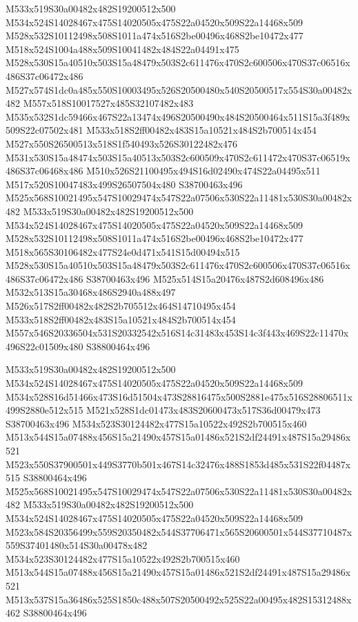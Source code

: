 \documentclass{article}
\begin{document}
\begin{multicols}{2}
M533x519S30a00482x482S19200512x500 M534x524S14028467x475S14020505x475S22a04520x509S22a14468x509 M528x532S10112498x508S1011a474x516S2be00496x468S2be10472x477 M518x524S1004a488x509S10041482x484S22a04491x475 M528x530S15a40510x503S15a48479x503S2c611476x470S2c600506x470S37c06516x486S37c06472x486 M527x574S1dc0a485x550S10003495x526S20500480x540S20500517x554S30a00482x482 M557x518S10017527x485S32107482x483 M535x532S1dc59466x467S22a13474x496S20500490x484S20500464x511S15a3f489x509S22c07502x481 M533x518S2ff00482x483S15a10521x484S2b700514x454 M527x550S26500513x518S1f540493x526S30122482x476 M531x530S15a48474x503S15a40513x503S2c600509x470S2c611472x470S37c06519x486S37c06468x486 M510x526S21100495x494S16d02490x474S22a04495x511 M517x520S10047483x499S26507504x480 S38700463x496 M525x568S10021495x547S10029474x547S22a07506x530S22a11481x530S30a00482x482 M533x519S30a00482x482S19200512x500 M534x524S14028467x475S14020505x475S22a04520x509S22a14468x509 M528x532S10112498x508S1011a474x516S2be00496x468S2be10472x477 M518x565S30106482x477S24e0d471x541S15d00494x515 M528x530S15a40510x503S15a48479x503S2c611476x470S2c600506x470S37c06516x486S37c06472x486 S38700463x496 M525x514S15a20476x487S2d608496x486 M532x513S15a30468x486S2940a488x497 M526x517S2ff00482x482S2b705512x464S14710495x454 M533x518S2ff00482x483S15a10521x484S2b700514x454 M557x546S20336504x531S20332542x516S14c31483x453S14c3f443x469S22c11470x496S22c01509x480 S38800464x496

M533x519S30a00482x482S19200512x500 M534x524S14028467x475S14020505x475S22a04520x509S22a14468x509 M534x528S16d51466x473S16d51504x473S28816475x500S2881e475x516S28806511x499S2880e512x515 M521x528S1dc01473x483S20600473x517S36d00479x473 S38700463x496 M534x523S30124482x477S15a10522x492S2b700515x460 M513x544S15a07488x456S15a21490x457S15a01486x521S2df24491x487S15a29486x521 M523x550S37900501x449S3770b501x467S14c32476x488S1853d485x531S22f04487x515 S38800464x496 M525x568S10021495x547S10029474x547S22a07506x530S22a11481x530S30a00482x482 M533x519S30a00482x482S19200512x500 M534x524S14028467x475S14020505x475S22a04520x509S22a14468x509 M523x584S20356499x559S20350482x544S37706471x565S20600501x544S37710487x559S37401480x514S30a00478x482 M534x523S30124482x477S15a10522x492S2b700515x460 M513x544S15a07488x456S15a21490x457S15a01486x521S2df24491x487S15a29486x521 M513x537S15a36486x525S1850c488x507S20500492x525S22a00495x482S15312488x462 S38800464x496


\end{multicols}
\end{document}
